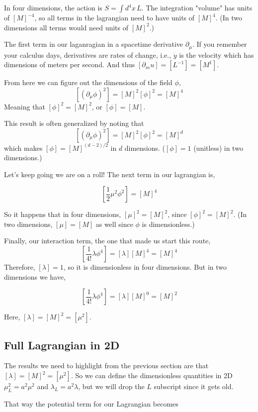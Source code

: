 In four dimensions, the action is $S = \int d^4x \, L$.
The integration "volume" has units of $[M]^{-4}$, so all terms in the lagrangian need to have units of $[M]^4$.
(In two dimensions all terms would need units of $[M]^2$.)

The first term in our laganragian in a spacetime derivative $\partial_\mu$.
If you remember your calculus days, derivatives are rates of change, i.e.,
$\dot{y}$ is the velocity which has dimensions of meters per second.
And thus $[\partial_mu] = [L^{-1}] = [M^1]$.

From here we can figure out the dimensions of the field $\phi$,
$$
[\left(\partial_\mu \phi\right)^2] = [M]^2 [\phi]^2 = [M]^4
$$
Meaning that $[\phi]^2 = [M]^2$, or $[\phi] = [M]$.

This result is often generalized by noting that
$$
[\left(\partial_\mu \phi\right)^2] = [M]^2 [\phi]^2 = [M]^d
$$
which makes $[\phi] = [M]^{(d-2)/2}$ in $d$ dimensions.
($[\phi] = 1$ (unitless) in two dimensions.)


Let's keep going we are on a roll!
The next term in our lagrangian is,

$$
\left[ \frac{1}{2} \mu^2 \phi^2 \right] = [M]^4
$$

So it happens that in four dimensions, $[\mu]^2 = [M]^2$, since $[\phi]^2 = [M]^2$.
(In two dimensions, $[\mu] = [M]$ as well since $\phi$ is dimensionless.)


Finally, our interaction term, the one that made us start this route,
$$
\left[ \frac{1}{4!} \lambda \phi^4 \right] = [\lambda] [M]^4 = [M]^4
$$
Therefore, $[\lambda] = 1$, so it is dimensionless in four dimensions.
But in two dimensions we have,

$$
\left[ \frac{1}{4!} \lambda \phi^4 \right] = [\lambda] [M]^0 = [M]^2
$$

Here, $[\lambda] = [M]^2 = [\mu^2]$.



\subsection{Full Lagrangian in 2D}

The results we need to highlight from the previous section are that $[\lambda] = [M]^2 = [\mu^2]$.
So we can define the dimensionless quantities in 2D $\mu^{2}_{L} = a^2 \mu^2$ and $\lambda_L = a^2 \lambda$,
but we will drop the $L$ subscript since it gets old.

That way the potential term for our Lagrangian becomes


